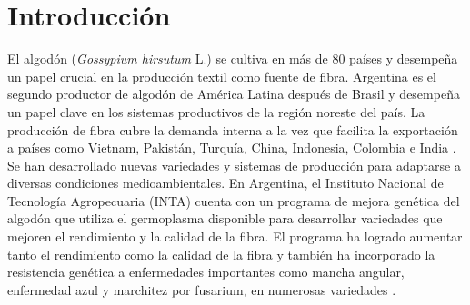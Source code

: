 \documentclass[12pt,oneside]{reedthesis}
\renewcommand{\headrulewidth}{0pt} %
\begin{document}
\fancyfoot[C]{}           %
\fancyfoot[L]{}           %
\fancyfoot[R]{\thepage}   %
\fancyfoot[R]{\fontsize{10}{12}\selectfont \thepage} %

\mainmatter %
\pagestyle{fancyplain} %
\renewcommand{\headrulewidth}{0.4pt} %


\chapter*{Introducción}\label{introducciuxf3n}

El algodón (\emph{Gossypium hirsutum} L.) se cultiva en más de 80 países y desempeña un papel crucial en la producción textil como fuente de fibra. Argentina es el segundo productor de algodón de América Latina después de Brasil y desempeña un papel clave en los sistemas productivos de la región noreste del país. La producción de fibra cubre la demanda interna a la vez que facilita la exportación a países como Vietnam, Pakistán, Turquía, China, Indonesia, Colombia e India \autocite{icac2023,paytas2013}. Se han desarrollado nuevas variedades y sistemas de producción para adaptarse a diversas condiciones medioambientales. En Argentina, el Instituto Nacional de Tecnología Agropecuaria (INTA) cuenta con un programa de mejora genética del algodón que utiliza el germoplasma disponible para desarrollar variedades que mejoren el rendimiento y la calidad de la fibra. El programa ha logrado aumentar tanto el rendimiento como la calidad de la fibra y también ha incorporado la resistencia genética a enfermedades importantes como mancha angular, enfermedad azul y marchitez por fusarium, en numerosas variedades \autocite{royo2007,scarpin2022,scarpin2023}.
\end{document}
